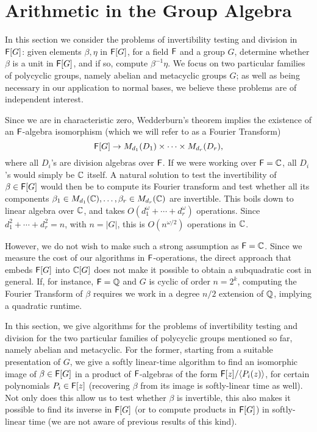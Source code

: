  \section{Arithmetic in the Group Algebra}
\label{sec:invertibility}

In this section we consider the problems of invertibility testing and
division in ${\mathsf{F}}[G]$: given elements $\beta,\eta$ in ${\mathsf{F}}[G]$, for a
field ${\mathsf{F}}$ and a group $G$, determine whether $\beta$ is a unit in
${\mathsf{F}}[G]$, and if so, compute $\beta^{-1}\eta$. We focus on two
particular families of polycyclic groups, namely abelian and
metacyclic groups $G$; as well as being necessary in our application
to normal bases, we believe these problems are of independent
interest.

Since we are in characteristic zero, Wedderburn's theorem implies the
existence of an ${\mathsf{F}}$-algebra isomorphism (which we will refer to as a
Fourier Transform)
\[
  {\mathsf{F}}[G] \to M_{d_1}(D_1) \times \dots \times M_{d_r}(D_r),
\]
where all $D_i$'s are division algebras over ${\mathsf{F}}$. If we were working
over ${\mathsf{F}}=\mathbb{C}$, all $D_i$'s would simply be $\mathbb{C}$ itself.  A natural
solution to test the invertibility of $\beta \in {\mathsf{F}}[G]$ would then be
to compute its Fourier transform and test whether all its components
$\beta_1 \in M_{d_1}(\mathbb{C}),\dots,\beta_r \in M_{d_r}(\mathbb{C})$ are
invertible. This boils down to linear algebra over $\mathbb{C}$, and takes
$O(d_1^\omega + \cdots + d_r^\omega)$ operations.  Since $d_1^2 +
\cdots + d_r^2 = n$, with $n=|G|$, this is $O(n^{\omega/2})$
operations in $\mathbb{C}$.

However, we do not wish to make such a strong assumption as ${\mathsf{F}}=\mathbb{C}$. Since
we measure the cost of our algorithms in ${\mathsf{F}}$-operations, the direct
approach that embeds ${\mathsf{F}}[G]$ into $\mathbb{C}[G]$ does not make it possible to
obtain a subquadratic cost in general. If, for instance, ${\mathsf{F}}=\mathbb{Q}$ and $G$ is
cyclic of order $n=2^k$, computing the Fourier Transform of $\beta$
requires we work in a degree $n/2$ extension of $\mathbb{Q}$, implying a quadratic
runtime.

In this section, we give algorithms for the problems of invertibility
testing and division for the two particular families of polycyclic
groups mentioned so far, namely abelian and metacyclic. For the former,
starting from a suitable presentation of $G$, we give a softly
linear-time algorithm to find an isomorphic image of $\beta \in {\mathsf{F}}[G]$
in a product of ${\mathsf{F}}$-algebras of the form ${\mathsf{F}}[z]/\langle
P_i(z)\rangle$, for certain polynomials $P_i \in {\mathsf{F}}[z]$ (recovering
$\beta$ from its image is softly-linear time as well). Not only does
this allow us to test whether $\beta$ is invertible, this also makes
it possible to find its inverse in ${\mathsf{F}}[G]$ (or to compute products in
${\mathsf{F}}[G]$) in softly-linear time (we are not aware of previous results
of this kind).


